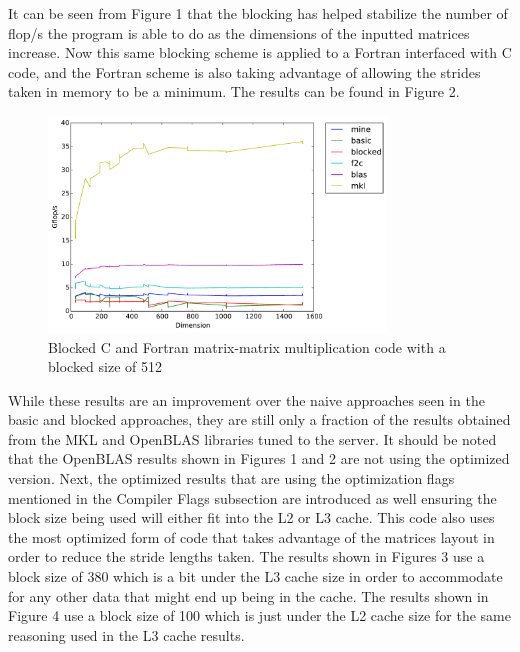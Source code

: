 \documentclass{article}
\begin{document}
\noindent It can be seen from Figure 1 that the blocking has helped stabilize the number of flop/s the program is able to do as the dimensions of the inputted matrices increase. Now this same blocking scheme is applied to a Fortran interfaced with C code, and the Fortran scheme is also taking advantage of allowing the strides taken in memory to be a minimum. The results can be found in Figure 2.

\begin{figure}[H]
  \centering
    \includegraphics[width=0.8\textwidth]{c_f_blocked_no_opt_flags}
    \caption{Blocked C and Fortran matrix-matrix multiplication code with a blocked size of 512}
\end{figure}

\noindent While these results are an improvement over the naive approaches seen in the basic and blocked approaches, they are still only a fraction of the results obtained from the MKL and OpenBLAS libraries tuned to the server. It should be noted that the OpenBLAS results shown in Figures 1 and 2 are not using the optimized version.  Next, the optimized results that are using the optimization flags mentioned in the Compiler Flags subsection are introduced as well ensuring the block size being used will either fit into the L2 or L3 cache. This code also uses the most optimized form of code that takes advantage of the matrices layout in order to reduce the stride lengths taken. The results shown in Figures 3 use a block size of 380 which is a bit under the L3 cache size in order to accommodate for any other data that might end up being in the cache. The results shown in Figure 4 use a block size of 100 which is just under the L2 cache size for the same reasoning used in the L3 cache results. 
\end{document}
